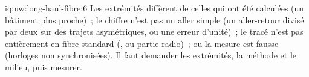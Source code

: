 \begin{solution}{iq:nw:long-haul-fibre:6}
Les extrémités diffèrent de celles qui ont été calculées (un bâtiment plus proche)~; le chiffre n'est pas un aller simple (un aller-retour divisé par deux sur des trajets asymétriques, ou
une erreur d'unité)~; le tracé n'est pas entièrement en fibre standard (, ou partie radio)~; ou la mesure est fausse (horloges non synchronisées). Il faut demander
les extrémités, la méthode et le milieu, puis mesurer.
\end{solution}

